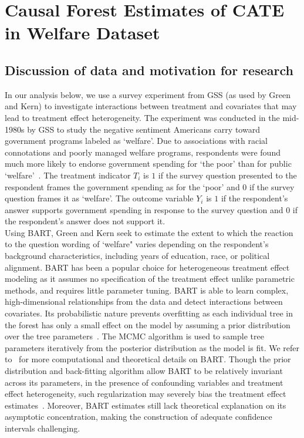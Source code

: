 \documentclass[12pt]{article}
\begin{document}
\section{Causal Forest Estimates of CATE in Welfare Dataset} 

\subsection{Discussion of data and motivation for research} 
In our analysis below, we use a survey experiment from GSS (as used by Green and
Kern) to investigate interactions between treatment and covariates that may lead
to treatment effect heterogeneity. The experiment was conducted in the mid-1980s
by GSS to study the negative sentiment Americans carry toward government
programs labeled as `welfare'. Due to associations with racial connotations and
poorly managed welfare programs, respondents were found much more likely to
endorse government spending for `the poor' than for public
`welfare'~\cite{rasinski1989}. The treatment indicator $T_i$ is $1$ if the
survey question presented to the respondent frames the government spending as
for the `poor' and $0$ if the survey question frames it as `welfare'. The
outcome variable $Y_i$ is $1$ if the respondent's answer supports government
spending in response to the survey question and $0$ if the respondent's answer
does not support it. \\

Using BART, Green and Kern seek to estimate the extent to which the reaction to
the question wording of `welfare" varies depending on the respondent's
background characteristics, including years of education, race, or political
alignment. BART has been a popular choice for heterogeneous treatment effect
modeling as it assumes no specification of the treatment effect unlike
parametric methods, and requires little parameter tuning. BART is able to learn
complex, high-dimensional relationships from the data and detect interactions
between covariates. Its probabilistic nature prevents overfitting as each
individual tree in the forest has only a small effect on the model by assuming a
prior distribution over the tree parameters~\cite{Chipman2010}. The MCMC
algorithm is used to sample tree parameters iteratively from the posterior
distribution as the model is fit. We refer to~\cite{Chipman2010} for more
computational and theoretical details on BART. Though the prior distribution and
back-fitting algorithm allow BART to be relatively invariant across its
parameters, in the presence of confounding variables and treatment effect
heterogeneity, such regularization may severely bias the treatment effect
estimates~\cite{CarvalhoHahnMurray}. Moreover, BART estimates still lack
theoretical explanation on its asymptotic concentration, making the construction
of adequate confidence intervals challenging. 
\end{document}
